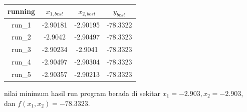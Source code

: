 \documentclass[paper=a4, fontsize=11pt]{scrartcl}
\numberwithin{equation}{section} %
\numberwithin{figure}{section} %
\numberwithin{table}{section} %
\begin{document}
\begin{itemize}
\begin{table}[ht]
\center
\begin{tabular}{c c c c}
\hline
running & $x_{1,best}$ & $x_{2,best}$ & $y_{best}$ \\ [0.5ex]
\hline 
run\_1 & -2.90181 & -2.90195  & -78.3322 \\
run\_2 & -2.9042 & -2.90497  & -78.3323 \\
run\_3 & -2.90234 & -2.9041  & -78.3323 \\
run\_4 & -2.90497 & -2.90304  & -78.3323 \\
run\_5 & -2.90357 & -2.90213  & -78.3323 \\ [1ex]
\hline 
\end{tabular}
\end{table}
nilai minimum hasil run program berada di sekitar $x_{1} = -2.903, x_{2} = -2.903$, dan $f(x_{1},x_{2}) = -78.3323$.



\end{itemize}
\end{document}
